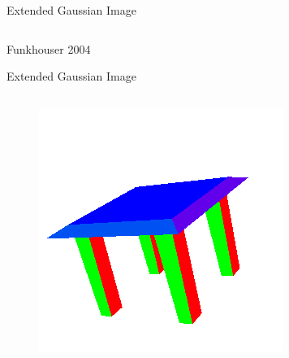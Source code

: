 \documentclass{beamer}
\begin{document}
\begin{frame}{Extended Gaussian Image}
\begin{columns}[c]
\end{columns}



\begin{itemize}[label=$\vartriangleright$]


\end{itemize}

\small Funkhouser 2004

\end{frame}


\begin{frame}{Extended Gaussian Image}

\begin{columns}[c]

\begin{figure}[t]
    \includegraphics[width=\textwidth]{Table.png}
\end{figure}


\end{columns}
\end{frame}
\end{document}

